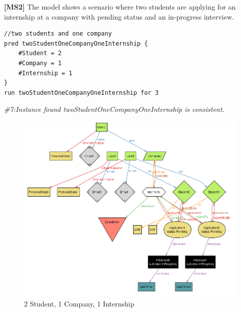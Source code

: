 \textbf{[MS2]} The model shows a scenario where two students are applying for an internship at a company with pending status and an in-progress interview.
\begin{lstlisting}
//two students and one company
pred twoStudentOneCompanyOneInternship {
    #Student = 2
    #Company = 1
    #Internship = 1
}
run twoStudentOneCompanyOneInternship for 3
\end{lstlisting}
\textit{ \#7:Instance found twoStudentOneCompanyOneInternship is consistent.}
\begin{figure}[H]
    \centering
    \includegraphics[width=1\linewidth]{RASD//Images/2st1com.png}
    \caption{2 Student, 1 Company, 1 Internship}
    \label{fig:enter-label}
\end{figure}

